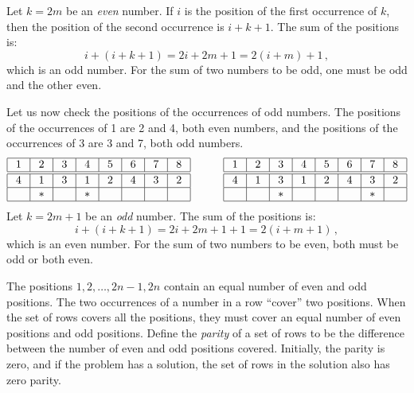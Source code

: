 Let $k=2m$ be an \emph{even} number. If $i$ is the position of the first occurrence of $k$, then the position of the second occurrence is $i+k+1$.
The sum of the positions is:
\[
i+(i+k+1)=2i+2m+1=2(i+m)+1\,,
\]
which is an odd number. For the sum of two numbers to be odd, one must be odd and the other even.

Let us now check the positions of the occurrences of odd numbers. The positions of the occurrences of 1 are 2 and 4, both even numbers, and the positions of the occurrences of 3 are 3 and 7, both odd numbers.
\[
\addtolength{\arraycolsep}{1mm}
\begin{array}{|c|c|c|c|c|c|c|c|}
\hline
1&2&3&4&5&6&7&8\\
\hline\hline
4&1&3&1&2&4&3&2\\\hline
&*&&*&&&&\\\hline
\end{array}
\hspace{3em}
\begin{array}{|c|c|c|c|c|c|c|c|}
\hline
1&2&3&4&5&6&7&8\\
\hline\hline
4&1&3&1&2&4&3&2\\\hline
&&*&&&&*&\\\hline
\end{array}
\]
Let $k=2m+1$ be an \emph{odd} number. The sum of the positions is:
\[
i+(i+k+1)=2i+2m+1+1=2(i+m+1)\,,
\]
which is an even number. For the sum of two numbers to be even, both must be odd or both even.

The positions $1,2,\ldots,2n-1,2n$ contain an equal number of even and odd positions. The two occurrences of a number in a row ``cover'' two positions. When the set of rows covers all the positions, they must cover an equal number of even positions and odd positions. Define the \emph{parity} of a set of rows to be the difference between the number of even and odd positions covered. Initially, the parity is zero, and if the problem has a solution, the set of rows in the solution also has zero parity.

